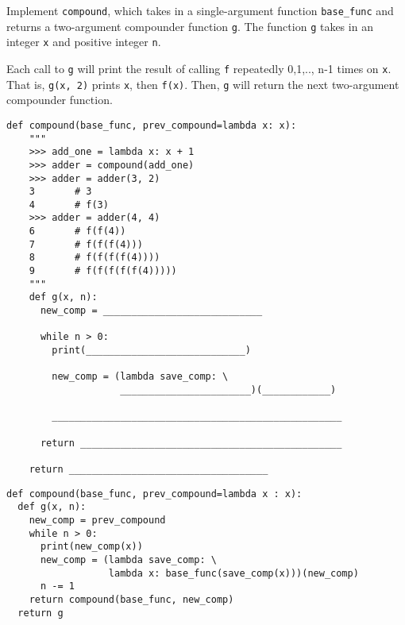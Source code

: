 \begin{blocksection}
\question Implement \texttt{compound}, which takes in a single-argument function \texttt{base\_func} and returns a two-argument compounder function \texttt{g}. The function \texttt{g} takes in an integer \texttt{x} and positive integer \texttt{n}.

Each call to \texttt{g} will print the result of calling \texttt{f} repeatedly 0,1,.., n-1 times on \texttt{x}. That is, \texttt{g(x, 2)} prints \texttt{x}, then \texttt{f(x)}. Then, \texttt{g} will return the next two-argument compounder function.

\begin{lstlisting}
def compound(base_func, prev_compound=lambda x: x):
    """
    >>> add_one = lambda x: x + 1
    >>> adder = compound(add_one)
    >>> adder = adder(3, 2)
    3       # 3
    4       # f(3)
    >>> adder = adder(4, 4)
    6       # f(f(4))
    7       # f(f(f(4)))
    8       # f(f(f(f(4))))
    9       # f(f(f(f(f(4)))))
    """
    def g(x, n):
      new_comp = ____________________________

      while n > 0:
        print(____________________________)

        new_comp = (lambda save_comp: \
                    _______________________)(____________)

        ___________________________________________________

      return ______________________________________________
      
    return ___________________________________  
\end{lstlisting}

\begin{solution}[1in]
\begin{lstlisting}
def compound(base_func, prev_compound=lambda x : x):
  def g(x, n):
    new_comp = prev_compound
    while n > 0:
      print(new_comp(x))
      new_comp = (lambda save_comp: \
                  lambda x: base_func(save_comp(x)))(new_comp)
      n -= 1
    return compound(base_func, new_comp)
  return g
\end{lstlisting}
\end{solution}
\end{blocksection}